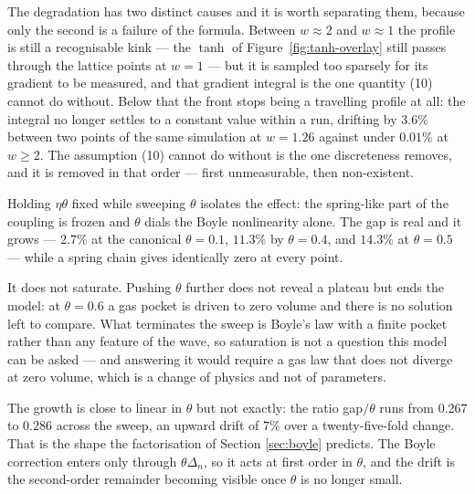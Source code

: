 The degradation has two distinct causes and it is worth separating them, because
only the second is a failure of the formula. Between $w \approx 2$ and $w \approx 1$
the profile is still a recognisable kink --- the $\tanh$ of
Figure~\ref{fig:tanh-overlay} still passes through the lattice points at $w = 1$ --- but it
is sampled too sparsely for its gradient to be measured, and that gradient integral is the
one quantity (10) cannot do without. Below that the front stops being a travelling profile at all:
the integral no longer settles to a constant value within a run, drifting by $3.6\%$
between two points of the same simulation at $w = 1.26$ against under $0.01\%$ at
$w \ge 2$. The assumption (10) cannot do without is the one discreteness removes,
and it is removed in that order --- first unmeasurable, then non-existent.

%

Holding $\eta\theta$ fixed while sweeping $\theta$ isolates the effect: the
spring-like part of the coupling is frozen and $\theta$ dials the Boyle
nonlinearity alone. The gap is real and it grows --- $2.7\%$ at the canonical
$\theta = 0.1$, $11.3\%$ by $\theta = 0.4$, and $14.3\%$ at $\theta = 0.5$ ---
while a spring chain gives identically zero at every point.

It does not saturate. Pushing $\theta$ further does not reveal a plateau but ends
the model: at $\theta = 0.6$ a gas pocket is driven to zero volume and there is no
solution left to compare. What terminates the sweep is Boyle's law with a finite
pocket rather than any feature of the wave, so saturation is not a question this
model can be asked --- and answering it would require a gas law that does not
diverge at zero volume, which is a change of physics and not of parameters.

The growth is close to linear in $\theta$ but not exactly: the ratio
gap$/\theta$ runs from $0.267$ to $0.286$ across the sweep, an upward drift of
$7\%$ over a twenty-five-fold change. That is the shape the factorisation of
Section \ref{sec:boyle} predicts. The Boyle correction enters only through
$\theta\Delta_n$, so it acts at first order in $\theta$, and the drift is the
second-order remainder becoming visible once $\theta$ is no longer small.
